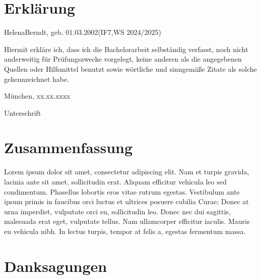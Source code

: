\documentclass[
  12pt,
  a4paperpaper,
]{report}
\begin{document}
\chapter*{Erklärung}

\begin{center}
  Helena\space Berndt, geb. 01.03.2002\space (IF7,\space WS 2024/2025)
\end{center}

\vspace*{1.0cm}

\noindent Hiermit erkläre ich, dass ich die Bachelorarbeit selbständig
verfasst, noch nicht anderweitig für Prüfungszwecke vorgelegt, keine
anderen als die angegebenen Quellen oder Hilfsmittel benutzt sowie
wörtliche und sinngemäße Zitate als solche gekennzeichnet habe.

\vspace*{1.0cm}

München, xx.xx.xxxx

\vspace*{1.0cm}

\dotfill

Unterschrift \vspace*{\fill} 

\chapter*{Zusammenfassung}\label{zusammenfassung}

Lorem ipsum dolor sit amet, consectetur adipiscing elit. Nam et turpis
gravida, lacinia ante sit amet, sollicitudin erat. Aliquam efficitur
vehicula leo sed condimentum. Phasellus lobortis eros vitae rutrum
egestas. Vestibulum ante ipsum primis in faucibus orci luctus et
ultrices posuere cubilia Curae; Donec at urna imperdiet, vulputate orci
eu, sollicitudin leo. Donec nec dui sagittis, malesuada erat eget,
vulputate tellus. Nam ullamcorper efficitur iaculis. Mauris eu vehicula
nibh. In lectus turpis, tempor at felis a, egestas fermentum massa.

\setcounter{page}{1}

\newpage

\chapter*{Danksagungen}\label{danksagungen}
\end{document}
